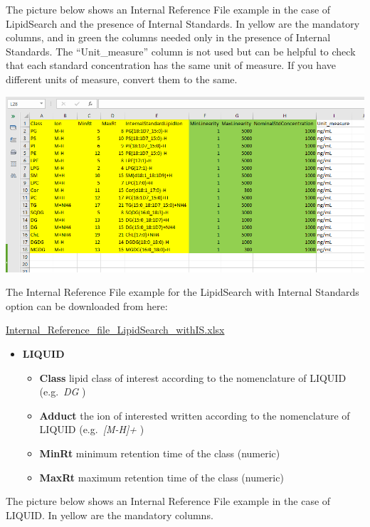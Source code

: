 \documentclass[
]{book}
\providecommand{\tightlist}{%
  \setlength{\itemsep}{0pt}\setlength{\parskip}{0pt}}
\begin{document}
The picture below shows an Internal Reference File example in the case of LipidSearch and the presence of Internal Standards. In yellow are the mandatory columns, and in green the columns needed only in the presence of Internal Standards. The ``Unit\_measure'' column is not used but can be helpful to check that each standard concentration has the same unit of measure. If you have different units of measure, convert them to the same.

\includegraphics[width=1\linewidth]{images/internal_reference_example}

The Internal Reference File example for the LipidSearch with Internal Standards option can be downloaded from here:

\href{https://github.com/ShinyFabio/ADViSELipidomics_book/raw/main/data_example/Internal_Reference_file_LipidSearch_withIS.xlsx}{Internal\_Reference\_file\_LipidSearch\_withIS.xlsx}

\begin{itemize}
\tightlist
\item
  \textbf{LIQUID}

  \begin{itemize}
  \tightlist
  \item
    \textbf{Class} lipid class of interest according to the nomenclature of LIQUID (e.g.~\emph{DG} )
  \item
    \textbf{Adduct} the ion of interested written according to the nomenclature of LIQUID (e.g.~\emph{{[}M-H{]}+} )
  \item
    \textbf{MinRt} minimum retention time of the class (numeric)
  \item
    \textbf{MaxRt} maximum retention time of the class (numeric)
  \end{itemize}
\end{itemize}

The picture below shows an Internal Reference File example in the case of LIQUID. In yellow are the mandatory columns.
\end{document}
